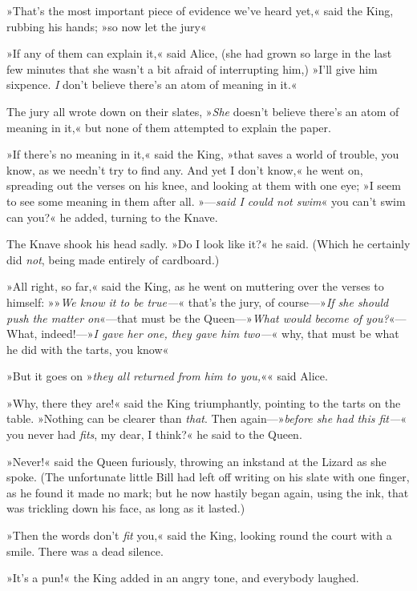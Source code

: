 »That's the most important piece of evidence we've heard yet,« said the King, rubbing his hands; »so now let the jury\longdash«

»If any of them can explain it,« said Alice, (she had grown so large in the last few minutes that she wasn't a bit afraid of interrupting him,) »I'll give him sixpence. \textit{I} don't believe there's an atom of meaning in it.«

The jury all wrote down on their slates, »\textit{She} doesn't believe there's an atom of meaning in it,« but none of them attempted to explain the paper.

»If there's no meaning in it,« said the King, »that saves a world of trouble, you know, as we needn't try to find any. And yet I don't know,« he went on, spreading out the verses on his knee, and looking at them with one eye; »I seem to see some meaning in them after all. »—\textit{said I could not swim}\longdash« you can't swim can you?« he added, turning to the Knave.

The Knave shook his head sadly. »Do I look like it?« he said. (Which he certainly did \textit{not}, being made entirely of cardboard.)

»All right, so far,« said the King, as he went on muttering over the verses to himself: »»\textit{We know it to be true—}« that's the jury, of course—»\textit{If she should push the matter on}«—that must be the Queen—»\textit{What would become of you?}«—What, indeed!—»\textit{I gave her one, they gave him two—}« why, that must be what he did with the tarts, you know\longdash«

»But it goes on »\textit{they all returned from him to you,}«« said Alice.

»Why, there they are!« said the King triumphantly, pointing to the tarts on the table. »Nothing can be clearer than \textit{that}. Then again—»\textit{before she had this fit—}« you never had \textit{fits}, my dear, I think?« he said to the Queen.

»Never!« said the Queen furiously, throwing an inkstand at the Lizard as she spoke. (The unfortunate little Bill had left off writing on his slate with one finger, as he found it made no mark; but he now hastily began again, using the ink, that was trickling down his face, as long as it lasted.)


»Then the words don't \textit{fit} you,« said the King, looking round the court with a smile. There was a dead silence.

»It's a pun!« the King added in an angry tone, and everybody laughed.

